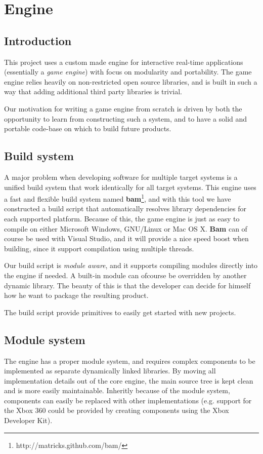 
\chapter{Engine}
\section {Introduction}
This project uses a custom made engine for interactive real-time applications (essentially a \textit{game engine}) with focus on modularity and portability. The game engine relies heavily on non-restricted open source libraries, and is built in such a way that adding additional third party libraries is trivial.

Our motivation for writing a game engine from scratch is driven by both the opportunity to learn from
constructing such a system, and to have a solid and portable code-base on which to build future products.

\section {Build system}
A major problem when developing software for multiple target systems is a unified build system that work
identically for all target systems. This engine uses a fast and flexible build system named \textbf{bam}\footnote{http://matricks.github.com/bam/}, and
with this tool we have constructed a build script that automatically resolves library dependencies for each supported platform. Because of this, the game engine is just as easy to compile on either Microsoft Windows, GNU/Linux or Mac OS X. \textbf{Bam} can of course be used with Visual Studio, and it will provide a nice speed boost when building, since it support compilation using multiple threads.

Our build script is \textit{module aware}, and it supports compiling modules directly into the engine if needed. A built-in module can ofcourse be overridden by another dynamic library. The beauty of this is that the developer can decide for himself how he want to package the resulting product.

The build script provide primitives to easily get started with new projects. 

\newpage

\section{Module system}
The engine has a proper module system, and requires complex components to be implemented as separate dynamically linked libraries. By moving all implementation details out of the core engine, the main source tree is kept clean and is more easily maintainable. Inheritly because of the module system, components can easily be replaced with other implementations (e.g. support for the Xbox 360 could be provided
by creating components using the Xbox Developer Kit).

